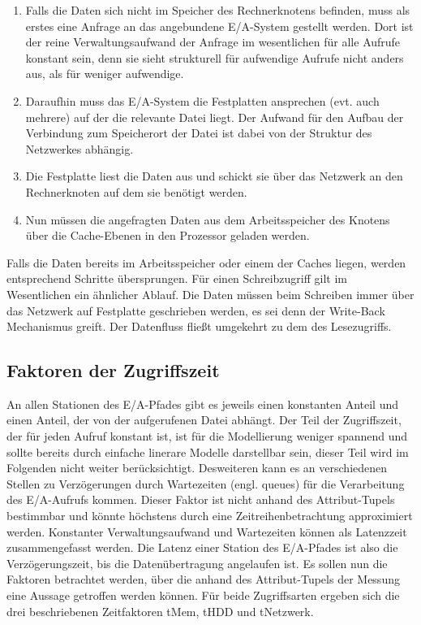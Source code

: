 \documentclass[
	12pt,
	a4paper,
	BCOR10mm,
	DIV14,
	listof=totoc,
	bibliography=totoc,
	headsepline
]{scrreprt}
\begin{document}
\begin{enumerate}
\item Falls die Daten sich nicht im Speicher des Rechnerknotens befinden, muss als erstes eine Anfrage an das angebundene E/A-System gestellt werden.
Dort ist der reine Verwaltungsaufwand der Anfrage im wesentlichen für alle Aufrufe konstant sein, denn sie sieht strukturell für aufwendige Aufrufe nicht anders aus, als für weniger aufwendige.
\item Daraufhin muss das E/A-System die Festplatten ansprechen (evt. auch mehrere) auf der die relevante Datei liegt. Der Aufwand für den Aufbau der Verbindung zum Speicherort der Datei ist dabei von der Struktur des Netzwerkes abhängig.
\item Die Festplatte liest die Daten aus und schickt sie über das Netzwerk an den Rechnerknoten auf dem sie benötigt werden.
\item Nun müssen die angefragten Daten aus dem Arbeitsspeicher des Knotens über die Cache-Ebenen in den Prozessor geladen werden. 
\end{enumerate}
Falls die Daten bereits im Arbeitsspeicher oder einem der Caches liegen, werden entsprechend Schritte übersprungen.
\medskip
Für einen Schreibzugriff gilt im Wesentlichen ein ähnlicher Ablauf.
Die Daten müssen beim Schreiben immer über das Netzwerk auf Festplatte geschrieben werden, es sei denn der Write-Back Mechanismus greift. Der Datenfluss fließt umgekehrt zu dem des Lesezugriffs.

\subsection{Faktoren der Zugriffszeit}
An allen Stationen des E/A-Pfades gibt es jeweils einen konstanten Anteil und einen Anteil, der von der aufgerufenen Datei abhängt. 
Der Teil der Zugriffszeit, der für jeden Aufruf konstant ist, ist für die Modellierung weniger spannend und sollte bereits durch einfache linerare Modelle darstellbar sein, dieser Teil wird im Folgenden nicht weiter berücksichtigt.
Desweiteren kann es an verschiedenen Stellen zu Verzögerungen durch Wartezeiten (engl. queues) für die Verarbeitung des E/A-Aufrufs kommen. Dieser Faktor ist nicht anhand des Attribut-Tupels bestimmbar und könnte höchstens durch eine Zeitreihenbetrachtung approximiert werden. Konstanter Verwaltungsaufwand und Wartezeiten können als Latenzzeit zusammengefasst werden. Die Latenz einer Station des E/A-Pfades ist also die Verzögerungszeit, bis die Datenübertragung angelaufen ist.
\medskip
Es sollen nun die Faktoren betrachtet werden, über die anhand des Attribut-Tupels der Messung eine Aussage getroffen werden können.
Für beide Zugriffsarten ergeben sich die drei beschriebenen Zeitfaktoren tMem, tHDD und tNetzwerk.
\end{document}
